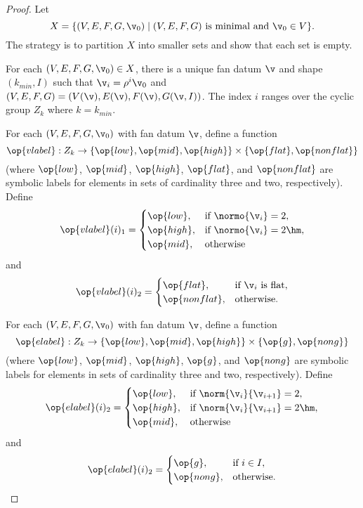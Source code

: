 \begin{proof}  
Let 
\begin{displaymath}X= \{(V,E,F,G,\v_0) \mid (V,E,F,G) \text{ is
minimal and } \v_0\in V\}.
\end{displaymath}  
The strategy is to partition $X$ into smaller sets and show that each
set is empty.

For each $(V,E,F,G,\v_0)\in X$, there is a unique fan datum $\v$ and
shape $(k_{min},I)$ such that $\v_i = \rho^i\v_0$ and $(V,E,F,G) =
(V(\v),E(\v),F(\v),G(\v,I))$.  The index $i$ ranges over the cyclic
group $Z_k$ where $k=k_{min}$.

For each $(V,E,F,G,\v_0)$ with fan datum $\v$, define a function
\begin{displaymath}
  \op{vlabel}:Z_k \to \{\op{low},\op{mid},\op{high}\} 
\times \{\op{flat},\op{nonflat}\}
\end{displaymath}
(where $\op{low}$, $\op{mid}$, $\op{high}$, $\op{flat}$, and
$\op{nonflat}$ are symbolic labels for elements in sets of cardinality
three and two, respectively).  Define
\begin{displaymath}
\op{vlabel}(i)_1 = \begin{cases}
\op{low}, &\text{if } \normo{\v_i} = 2,\\
\op{high}, &\text{if } \normo{\v_i} = 2\hm,\\
\op{mid}, &\text{otherwise}
\end{cases}
\end{displaymath}
and
\begin{displaymath}
\op{vlabel}(i)_2 = \begin{cases}
\op{flat}, &\text{if $\v_i$ is flat},\\
\op{nonflat}, &\text{otherwise}.
\end{cases}
\end{displaymath}

For each $(V,E,F,G,\v_0)$ with fan datum $\v$, define a function
\begin{displaymath}
  \op{elabel}:Z_k \to \{\op{low},\op{mid},\op{high}\} 
\times \{\op{g},\op{nong}\}
\end{displaymath}
(where $\op{low}$, $\op{mid}$, $\op{high}$, $\op{g}$, and $\op{nong}$
are symbolic labels for elements in sets of cardinality three and two,
respectively).  Define
\begin{displaymath}
\op{elabel}(i)_2 = \begin{cases}
\op{low}, &\text{if } \norm{\v_i}{\v_{i+1}} = 2,\\
\op{high}, &\text{if } \norm{\v_i}{\v_{i+1}} = 2\hm,\\
\op{mid}, &\text{otherwise}
\end{cases}
\end{displaymath}
and
\begin{displaymath}
\op{elabel}(i)_2 = \begin{cases}
\op{g}, &\text{if $i\in I$},\\
\op{nong}, &\text{otherwise}.
\end{cases}
\end{displaymath}


\end{proof}
